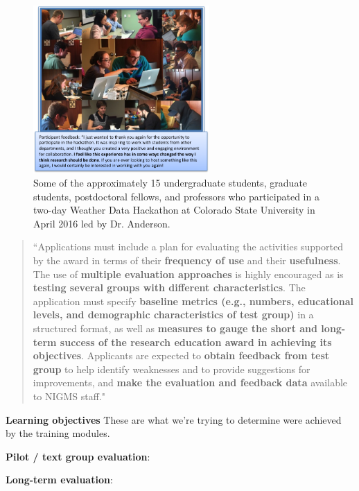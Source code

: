 \documentclass[pdftex,english,11pt,parskip=half]{scrartcl}
\begin{document}
\begin{figure} \centering \includegraphics[width =
0.6\textwidth]{figures/csu_hackathon.png} \caption{Some of the approximately 15
undergraduate students, graduate students, postdoctoral fellows, and professors
who participated in a two-day Weather Data Hackathon at Colorado State
University in April 2016 led by Dr. Anderson.} \label{csu-r-hackathon}
\end{figure}

\begin{quotation} ``Applications must include a plan for evaluating the
activities supported by the award in terms of their \textbf{frequency of use}
and their \textbf{usefulness}. The use of \textbf{multiple evaluation
approaches} is highly encouraged as is \textbf{testing several groups with
different characteristics}. The application must specify \textbf{baseline
metrics (e.g., numbers, educational levels, and demographic characteristics of
test group)} in a structured format, as well as \textbf{measures to gauge the
short and long-term success of the research education award in achieving its
objectives}. Applicants are expected to \textbf{obtain feedback from test group}
to help identify weaknesses and to provide suggestions for improvements, and
\textbf{make the evaluation and feedback data} available to NIGMS staff."
\end{quotation}



\textbf{Learning objectives} These are what we're trying to determine were achieved by the training modules.

\textbf{Pilot / text group evaluation}:

\textbf{Long-term evaluation}:
\end{document}

